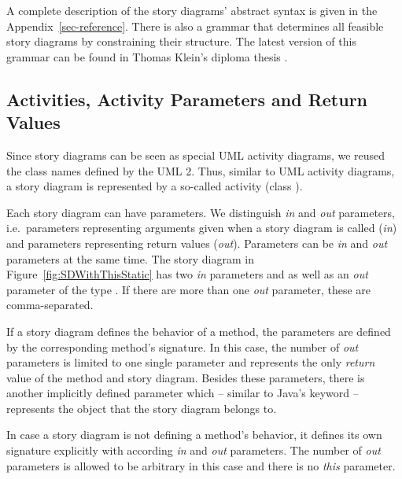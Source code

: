 A complete description of the story diagrams' abstract syntax is given in the Appendix~\ref{sec-reference}.
There is also a grammar that determines all feasible story diagrams by constraining their structure.
The latest version of this grammar can be found in Thomas Klein's diploma thesis \cite{Kle99}.



\subsection{Activities, Activity Parameters and Return Values}\label{sec:activities}

Since story diagrams can be seen as special UML activity diagrams, we reused the class names defined by the UML 2.
Thus, similar to UML activity diagrams, a story diagram is represented by a so-called activity (class ).

Each story diagram can have parameters.
We distinguish \emph{in} and \emph{out} parameters,
i.e.\ parameters representing arguments given when a story diagram is called (\emph{in})
and parameters representing return values (\emph{out}).
Parameters can be \emph{in} and \emph{out} parameters at the same time.
The story diagram in Figure~\ref{fig:SDWithThisStatic} has two \emph{in} parameters  and 
as well as an \emph{out} parameter  of the type .
If there are more than one \emph{out} parameter, these are comma-separated.

If a story diagram defines the behavior of a method, the parameters are defined by the corresponding method's signature.
In this case, the number of \emph{out} parameters is limited to one single parameter and represents the only \emph{return} value of the method and story diagram.
Besides these parameters, there is another implicitly defined parameter 
which -- similar to Java's  keyword -- represents the object that the story diagram belongs to.

In case a story diagram is not defining a method's behavior, it defines its own signature explicitly with according \emph{in} and \emph{out} parameters.
The number of \emph{out} parameters is allowed to be arbitrary in this case and there is no \emph{this} parameter.


